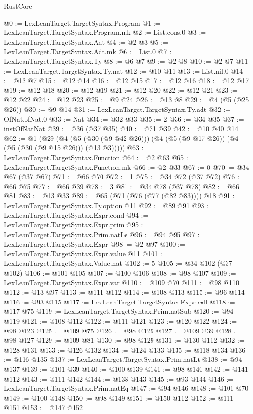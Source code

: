 \begin{lexlean}{RustCore}
\begin{coremodule}
@0 := LexLeanTarget.TargetSyntax.Program
@1 := LexLeanTarget.TargetSyntax.Program.mk
@2 := List.cons.{0}
@3 := LexLeanTarget.TargetSyntax.Adt
@4 := @2 @3
@5 := LexLeanTarget.TargetSyntax.Adt.mk
@6 := List.{0}
@7 := LexLeanTarget.TargetSyntax.Ty
@8 := @6 @7
@9 := @2 @8
@10 := @2 @7
@11 := LexLeanTarget.TargetSyntax.Ty.nat
@12 := @10 @11
@13 := List.nil.{0}
@14 := @13 @7
@15 := @12 @14
@16 := @12 @15
@17 := @12 @16
@18 := @12 @17
@19 := @12 @18
@20 := @12 @19
@21 := @12 @20
@22 := @12 @21
@23 := @12 @22
@24 := @12 @23
@25 := @9 @24
@26 := @13 @8
@29 := @4 (@5 (@25 @26))
@30 := @9 @14
@31 := LexLeanTarget.TargetSyntax.Ty.adt
@32 := OfNat.ofNat.{0}
@33 := Nat
@34 := @32 @33
@35 := 2
@36 := @34 @35
@37 := instOfNatNat
@39 := @36 (@37 @35)
@40 := @31 @39
@42 := @10 @40 @14
@62 := @1
    (@29 (@4 (@5 (@30 (@9 @42 @26))) (@4 (@5 (@9 @17 @26)) (@4 (@5 (@30 (@9 @15 @26))) (@13 @3)))))
@63 := LexLeanTarget.TargetSyntax.Function
@64 := @2 @63
@65 := LexLeanTarget.TargetSyntax.Function.mk
@66 := @2 @33
@67 := 0
@70 := @34 @67 (@37 @67)
@71 := @66 @70
@72 := 1
@75 := @34 @72 (@37 @72)
@76 := @66 @75
@77 := @66 @39
@78 := 3
@81 := @34 @78 (@37 @78)
@82 := @66 @81
@83 := @13 @33
@89 := @65 (@71 (@76 (@77 (@82 @83)))) @18
@91 := LexLeanTarget.TargetSyntax.Ty.option @11
@92 := @89 @91
@93 := LexLeanTarget.TargetSyntax.Expr.cond
@94 := LexLeanTarget.TargetSyntax.Expr.prim
@95 := LexLeanTarget.TargetSyntax.Prim.natLe
@96 := @94 @95
@97 := LexLeanTarget.TargetSyntax.Expr
@98 := @2 @97
@100 := LexLeanTarget.TargetSyntax.Expr.value @11
@101 := LexLeanTarget.TargetSyntax.Value.nat
@102 := 5
@105 := @34 @102 (@37 @102)
@106 := @101 @105
@107 := @100 @106
@108 := @98 @107
@109 := LexLeanTarget.TargetSyntax.Expr.var
@110 := @109 @70
@111 := @98 @110
@112 := @13 @97
@113 := @111 @112
@114 := @108 @113
@115 := @96 @114
@116 := @93 @115
@117 := LexLeanTarget.TargetSyntax.Expr.call
@118 := @117 @75
@119 := LexLeanTarget.TargetSyntax.Prim.natSub
@120 := @94 @119
@121 := @108 @112
@122 := @111 @121
@123 := @120 @122
@124 := @98 @123
@125 := @109 @75
@126 := @98 @125
@127 := @109 @39
@128 := @98 @127
@129 := @109 @81
@130 := @98 @129
@131 := @130 @112
@132 := @128 @131
@133 := @126 @132
@134 := @124 @133
@135 := @118 @134
@136 := @116 @135
@137 := LexLeanTarget.TargetSyntax.Prim.natLt
@138 := @94 @137
@139 := @101 @39
@140 := @100 @139
@141 := @98 @140
@142 := @141 @112
@143 := @111 @142
@144 := @138 @143
@145 := @93 @144
@146 := LexLeanTarget.TargetSyntax.Prim.natEq
@147 := @94 @146
@148 := @101 @70
@149 := @100 @148
@150 := @98 @149
@151 := @150 @112
@152 := @111 @151
@153 := @147 @152

\end{coremodule}
\end{lexlean}
